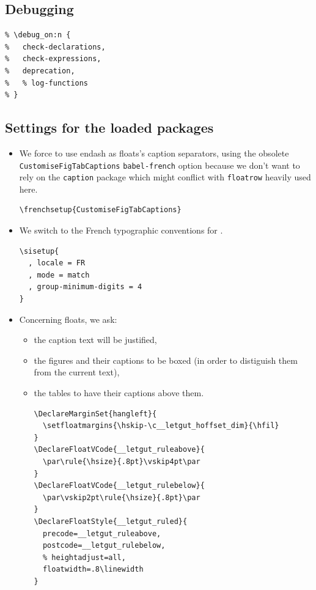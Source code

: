 \documentclass{letgut}
\begin{document}
\subsection{Debugging}
\label{Debugging-846g55h0jlj0}
\begin{lstlisting}
% \debug_on:n {
%   check-declarations,
%   check-expressions,
%   deprecation,
%   % log-functions
% }
\end{lstlisting}
\subsection{Settings for the loaded packages}
\label{ImplementationSettingsfortheloadedpackages-cdgg55h0jlj0}
\begin{itemize}
\item We force to use endash as floats's caption separators, using the obsolete
\lstinline+CustomiseFigTabCaptions+ \lstinline+babel-french+ option because we don't want to rely
on the \lstinline+caption+ package which might conflict with \lstinline+floatrow+ heavily used here.
\begin{lstlisting}
\frenchsetup{CustomiseFigTabCaptions}
\end{lstlisting}
\item We switch to the French typographic conventions for .
\begin{lstlisting}
\sisetup{
  , locale = FR
  , mode = match
  , group-minimum-digits = 4
}
\end{lstlisting}
\item Concerning floats, we ask:
\begin{itemize}
\item the caption text will be justified,
\item the figures and their captions to be boxed (in order to distiguish them from
the current text),
\item the tables to have their captions above them.
\begin{lstlisting}
\DeclareMarginSet{hangleft}{
  \setfloatmargins{\hskip-\c__letgut_hoffset_dim}{\hfil}
}
\DeclareFloatVCode{__letgut_ruleabove}{
  \par\rule{\hsize}{.8pt}\vskip4pt\par
}
\DeclareFloatVCode{__letgut_rulebelow}{
  \par\vskip2pt\rule{\hsize}{.8pt}\par
}
\DeclareFloatStyle{__letgut_ruled}{
  precode=__letgut_ruleabove,
  postcode=__letgut_rulebelow,
  % heightadjust=all,
  floatwidth=.8\linewidth
}

\end{lstlisting}
\end{itemize}
\end{itemize}
\end{document}

